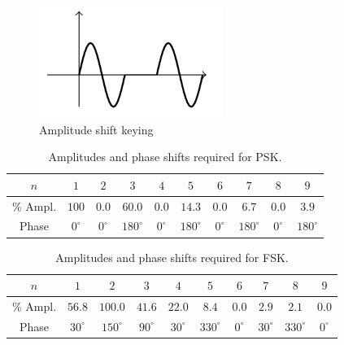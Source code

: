 \documentclass[12pt, a4paper, oneside, openright, titlepage]{book}
\begin{document}
\begin{itemize}[leftmargin = 50pt]
\begin{figure}[H]
    \centering
    \includegraphics[scale = 0.8]{Images/FS8.PNG}
    \caption{Amplitude shift keying}
    \label{fig:FS8}
\end{figure}

        \begin{table}[H]
            \centering 
            \caption{Amplitudes and phase shifts required for PSK.}
            \begin{tabular}{|c|c|c|c|c|c|c|c|c|c|}
                \hline
                $n$ & $1$ & $2$ & $3$ & $4$ & $5$ & $6$ & $7$ & $8$ & $9$ \\ \hline
                \% Ampl. & $100$ & $0.0 $& $60.0$ & $0.0$ & $14.3$ & $0.0$ & $6.7$ & $0.0$ & $3.9$ \\ 
                Phase & $0^{\circ}$ & $0^{\circ}$ & $180^{\circ}$ & $0^{\circ}$ & $180^{\circ}$ & $0^{\circ}$ & $180^{\circ}$ & $0^{\circ}$ & $180^{\circ}$ \\ \hline
            \end{tabular}
            \label{tab:FS6}
        \end{table}

        \begin{table}[H]
            \centering 
            \caption{Amplitudes and phase shifts required for FSK.}
            \begin{tabular}{|c|c|c|c|c|c|c|c|c|c|}
                \hline
                $n$ & $1$ & $2$ & $3$ & $4$ & $5$ & $6$ & $7$ & $8$ & $9$ \\ \hline
                \% Ampl. & $56.8$ & $100.0 $& $41.6$ & $22.0$ & $8.4$ & $0.0$ & $2.9$ & $2.1$ & $0.0$ \\ 
                Phase & $30^{\circ}$ & $150^{\circ}$ & $90^{\circ}$ & $30^{\circ}$ & $330^{\circ}$ & $0^{\circ}$ & $30^{\circ}$ & $330^{\circ}$ & $0^{\circ}$ \\ \hline
            \end{tabular}
            \label{tab:FS7}
        \end{table}


\end{itemize}
\end{document}
